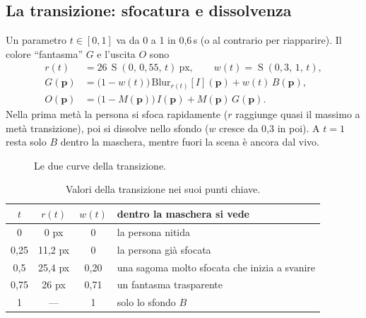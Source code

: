 \documentclass[11pt,a4paper]{article}
\newcommand{\Sm}{\operatorname{S}}
\newcommand{\vect}[1]{\mathbf{#1}}
\begin{document}
\subsection{La transizione: sfocatura e dissolvenza}
Un parametro $t\in[0,1]$ va da 0 a 1 in 0{,}6\,s (o al contrario per riapparire). Il colore
``fantasma'' $G$ e l'uscita $O$ sono
\begin{align}
  r(t) &= 26\,\Sm(0,\,0{,}55,\,t)\ \text{px}, \qquad w(t)=\Sm(0{,}3,\,1,\,t),\\
  G(\vect{p}) &= \bigl(1-w(t)\bigr)\,\mathrm{Blur}_{r(t)}[I](\vect{p})+w(t)\,B(\vect{p}),\\
  O(\vect{p}) &= \bigl(1-M(\vect{p})\bigr)\,I(\vect{p})+M(\vect{p})\,G(\vect{p}).
\end{align}
Nella prima metà la persona si sfoca rapidamente ($r$ raggiunge quasi il massimo a metà
transizione), poi si dissolve nello sfondo ($w$ cresce da 0,3 in poi). A $t=1$ resta solo $B$
dentro la maschera, mentre fuori la scena è ancora dal vivo.

\begin{figure}[htbp]
\centering
{}
\caption{Le due curve della transizione.}
\end{figure}

\begin{table}[htbp]
\centering
\small
\begin{tabular}{@{}cccl@{}}
\toprule
$t$ & $r(t)$ & $w(t)$ & dentro la maschera si vede\\
\midrule
0    & 0 px    & 0    & la persona nitida\\
0,25 & 11,2 px & 0    & la persona già sfocata\\
0,5  & 25,4 px & 0,20 & una sagoma molto sfocata che inizia a svanire\\
0,75 & 26 px   & 0,71 & un fantasma trasparente\\
1    & ---     & 1    & solo lo sfondo $B$\\
\bottomrule
\end{tabular}
\caption{Valori della transizione nei suoi punti chiave.}
\end{table}
\end{document}

